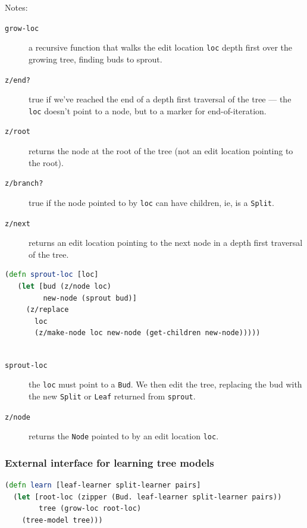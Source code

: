 \documentclass[10pt,openany]{article}
\numberwithin{definition}{section}
\numberwithin{example}{section}
\numberwithin{equation}{section}
\numberwithin{figure}{section}
\begin{document}
Notes:
\begin{description}
\item [{\texttt{grow-loc}}] a recursive function that walks the edit location
\texttt{loc} depth first over the growing tree, finding buds to sprout.
\item [{\texttt{z/end?}}] true if we've reached the end of a depth first
traversal of the tree --- the \texttt{loc} doesn't point to a node,
but to a marker for end-of-iteration.
\item [{\texttt{z/root}}] returns the node at the root of the tree (not
an edit location pointing to the root).
\item [{\texttt{z/branch?}}] true if the node pointed to by \texttt{loc}
can have children, ie, is a \texttt{Split}. 
\item [{\texttt{z/next}}] returns an edit location pointing to the next
node in a depth first traversal of the tree.
\end{description}
\begin{minipage}[t]{1\columnwidth}%
\begin{lstlisting}[caption={Sprouting a bud using a zipper},label={lis:grow-loc-1},language=clojure,tabsize=2]
(defn sprout-loc [loc]
   (let [bud (z/node loc)
         new-node (sprout bud)]
     (z/replace 
       loc 
       (z/make-node loc new-node (get-children new-node)))))
 
\end{lstlisting}
%
\end{minipage}
\begin{description}
\item [{\texttt{sprout-loc}}] the \texttt{loc} must point to a \texttt{Bud}.
We then edit the tree, replacing the bud with the new \texttt{Split}
or \texttt{Leaf} returned from \texttt{sprout}.
\item [{\texttt{z/node}}] returns the \texttt{Node} pointed to by an edit
location \texttt{loc}.
\end{description}

\subsubsection{External interface for learning tree models}
\begin{minipage}[t]{1\columnwidth}%
\begin{lstlisting}[caption={Tree learner},label={lis:tree-learner},language=clojure,tabsize=2]
(defn learn [leaf-learner split-learner pairs]
  (let [root-loc (zipper (Bud. leaf-learner split-learner pairs))
        tree (grow-loc root-loc)
    (tree-model tree))) 
\end{lstlisting}
%
\end{minipage}
\end{document}
